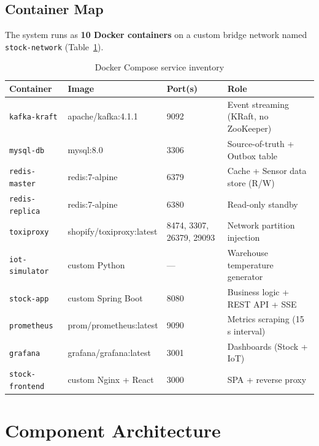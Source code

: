 \documentclass[12pt,a4paper,twoside]{article}
\begin{document}
\subsection{Container Map}

The system runs as \textbf{10 Docker containers} on a custom bridge
network named \texttt{stock-network} (Table~\ref{tab:containers}).

\begin{table}[H]
\centering
\caption{Docker Compose service inventory}
\label{tab:containers}
\begin{tabularx}{\textwidth}{@{}lllX@{}}
\toprule
\textbf{Container}       & \textbf{Image}              & \textbf{Port(s)}  & \textbf{Role} \\
\midrule
\texttt{kafka-kraft}     & apache/kafka:4.1.1          & 9092              & Event streaming (KRaft, no ZooKeeper) \\
\texttt{mysql-db}        & mysql:8.0                   & 3306              & Source-of-truth + Outbox table \\
\texttt{redis-master}    & redis:7-alpine              & 6379              & Cache + Sensor data store (R/W) \\
\texttt{redis-replica}   & redis:7-alpine              & 6380              & Read-only standby \\
\texttt{toxiproxy}       & shopify/toxiproxy:latest    & 8474, 3307, 26379, 29093 & Network partition injection \\
\texttt{iot-simulator}   & custom Python               & —                 & Warehouse temperature generator \\
\texttt{stock-app}       & custom Spring Boot          & 8080              & Business logic + REST API + SSE \\
\texttt{prometheus}      & prom/prometheus:latest      & 9090              & Metrics scraping (15 s interval) \\
\texttt{grafana}         & grafana/grafana:latest      & 3001              & Dashboards (Stock + IoT) \\
\texttt{stock-frontend}  & custom Nginx + React        & 3000              & SPA + reverse proxy \\
\bottomrule
\end{tabularx}
\end{table}

\section{Component Architecture}
\label{sec:components}
\end{document}
